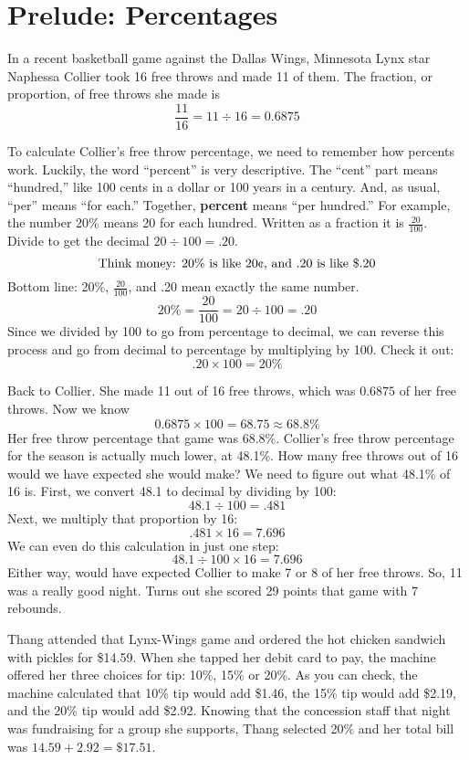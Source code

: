 \section{Prelude: Percentages}

In a recent basketball game against the Dallas Wings, Minnesota Lynx star Naphessa Collier took 16 free throws and made 11 of them. The fraction, or proportion, of free throws she made is $$\frac{11}{16} = 11 \div 16 = 0.6875$$

To calculate Collier's free throw percentage, we need to remember how percents work.  Luckily, the word ``percent'' is very descriptive.  The ``cent'' part means ``hundred,'' like 100 cents in a dollar or 100 years in a century.  And, as usual, ``per'' means ``for each.''  Together, \textbf{percent} means ``per hundred.''  For example, the number 20\% means 20 for each hundred.  Written as a fraction it is $\frac{20}{100}$.  Divide to get the decimal $20 \div 100 = .20.$   
$$\text{Think money:  }20\%\text{ is like }20\text{\textcent , and }.20\text{ is like }\$.20$$  
Bottom line:  20\%, $\frac{20}{100}$, and .20 mean exactly the same number.
$$20\% = \frac{20}{100} = 20 \div 100 = .20$$
Since we divided by 100 to go from percentage to decimal, we can reverse this process and go from decimal to percentage by multiplying by 100.  Check it out:
$$.20 \times 100 = 20\%$$

Back to Collier.  She made 11 out of 16 free throws, which was $ 0.6875$ of her free throws.  Now we know
$$ 0.6875 \times 100 = 68.75 \approx 68.8\%$$
Her free throw percentage that game was 68.8\%.  
Collier's free throw percentage for the season is actually much lower, at 48.1\%. How many free throws out of 16 would we have expected she would make?  We need to figure out what 48.1\% of 16 is.  First, we convert 48.1 to decimal by dividing by 100:
$$48.1 \div 100 = .481 $$
Next, we multiply that proportion by 16:
$$ .481 \times 16 = 7.696$$
We can even do this calculation in just one step:
$$48.1 \div 100 \times 16 = 7.696$$
Either way, would have expected Collier to make 7 or 8 of her free throws.  So, 11 was a really good night. Turns out she scored 29 points that game with 7 rebounds.

Thang attended that Lynx-Wings game and ordered the hot chicken sandwich with pickles for \$14.59.  When she tapped her debit card to pay, the machine offered her three choices for tip: 10\%, 15\% or 20\%. As you can check, the machine calculated that 10\% tip would add \$1.46, the 15\% tip would add \$2.19, and the 20\% tip would add \$2.92.   Knowing that the concession staff that night was fundraising for a group she supports, Thang selected 20\% and her total bill was $14.59 + 2.92 = \$17.51$.  

